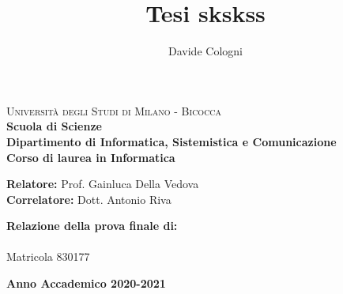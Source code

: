 \documentclass[a4paper,12pt,twoside]{report}
\title{Tesi skskss}
\author{Davide Cologni}
\makeatletter
\let\inserttitle\@title
\let\insertauthor\@author
\makeatother
\begin{document}
    
    \begin{titlepage}
        
        \noindent
        \begin{minipage}[t]{0.19\textwidth}
        \end{minipage}
        \begin{minipage}[t]{0.81\textwidth}
        {
                {\textsc{Università degli Studi di Milano - Bicocca}} \\
                \textbf{Scuola di Scienze} \\
                \textbf{Dipartimento di Informatica, Sistemistica e Comunicazione} \\
                \textbf{Corso di laurea in Informatica} \\
                \par
        }
        \end{minipage}
        
	\vspace{40mm}
        
	\begin{center}
            {\LARGE{
                    \textbf{\inserttitle}
                    \par
            }}
        \end{center}
        
        \vspace{50mm}

        \noindent
        {\large \textbf{Relatore:} Prof. Gainluca Della Vedova } \\

        \noindent
        {\large \textbf{Correlatore:} Dott. Antonio Riva}
        
        \vspace{15mm}

        \begin{flushright}
            {\large \textbf{Relazione della prova finale di:}} \\
            \large{\insertauthor} \\
            \large{Matricola 830177} 
        \end{flushright}
        
        \vspace{40mm}
        \begin{center}
            {\large{\bf Anno Accademico 2020-2021}}
        \end{center}
        
        \restoregeometry
        
    \end{titlepage}
\end{document}
